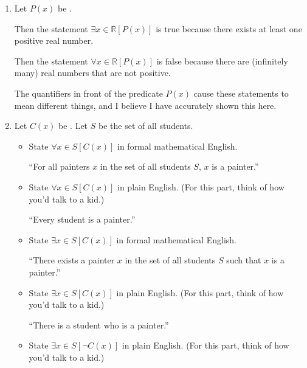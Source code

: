 \documentclass{article}
\begin{document}

\begin{enumerate}

      \item Let $P(x)$ be .

            Then the statement $\exists x \in \mathbb{R} [P(x)]$ is true because there
            exists at least one positive real number.

            Then the statement $\forall x \in \mathbb{R} [P(x)]$ is false because there are
            (infinitely many) real numbers that are not positive.

            The quantifiers in front of the predicate $P(x)$ cause these statements to mean
            different things, and I believe I have accurately shown this here.

            \newpage

      \item Let $C(x)$ be . Let $S$ be the set of all students.
            \begin{itemize}
                  \item State $\forall x \in S [C(x)]$ in formal mathematical English.

                        ``For all painters $x$ in the set of all students $S$, $x$ is a painter.''

                  \item State $\forall x \in S [C(x)]$ in plain English. (For this part, think of how
                        you'd talk to a kid.)

                        ``Every student is a painter.''

                  \item State $\exists x \in S [C(x)]$ in formal mathematical English.

                        ``There exists a painter $x$ in the set of all students $S$ such that $x$ is a painter.''

                  \item State $\exists x \in S [C(x)]$ in plain English. (For this part, think of how
                        you'd talk to a kid.)

                        ``There is a student who is a painter.''

                  \item State $\exists x \in S [\neg C(x)]$ in plain English. (For this part, think of
                        how you'd talk to a kid.)


\end{itemize}
\end{enumerate}
\end{document}
